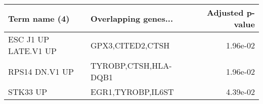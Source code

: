 \begin{tabular}{llr}
\toprule
       Term name (4) & Overlapping genes... &  Adjusted p-value \\
\midrule
ESC J1 UP LATE.V1 UP &     GPX3,CITED2,CTSH &          1.96e-02 \\
      RPS14 DN.V1 UP & TYROBP,CTSH,HLA-DQB1 &          1.96e-02 \\
            STK33 UP &    EGR1,TYROBP,IL6ST &          4.39e-02 \\
\bottomrule
\end{tabular}
